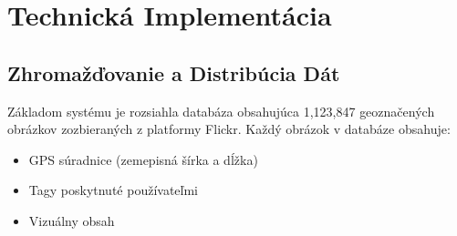 \documentclass[10pt,twoside,slovak,a4paper]{article}
\begin{document}
\section{Technická Implementácia}
\subsection*{Zhromažďovanie a Distribúcia Dát}

Základom systému je rozsiahla databáza obsahujúca 1,123,847 \cite{5495905} geoznačených obrázkov zozbieraných z platformy Flickr. Každý obrázok v databáze obsahuje:

\begin{itemize}
    \item GPS súradnice (zemepisná šírka a dĺžka)
    \item Tagy poskytnuté používateľmi
    \item Vizuálny obsah
\end{itemize}



\cite{5495905}
\end{document}

